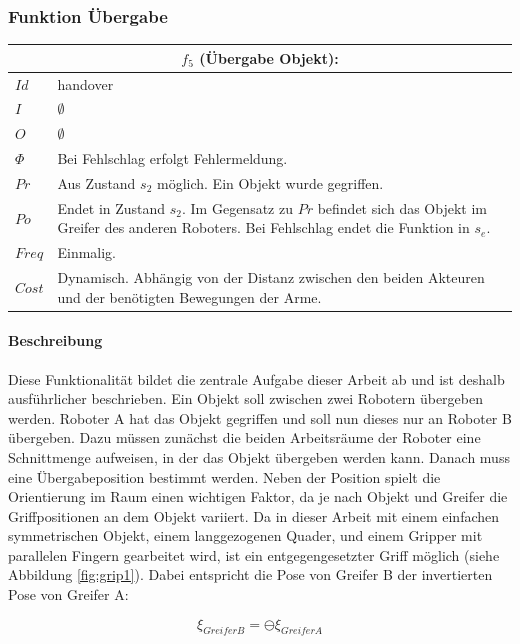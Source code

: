 \subsubsection{Funktion Übergabe}
\label{fun:han}
\begin{tabular}{|p{3cm}|p{10cm}|}
	\multicolumn{2}{c}{$f_5$ (Übergabe Objekt):}\\
	\hline  $Id$ & handover\\ 
	\hline  $I$ & $\emptyset$ \\ 
	\hline  $O$ & $\emptyset$ \\ 
	\hline  $\Phi$ & Bei Fehlschlag erfolgt Fehlermeldung.\\ 
	\hline $Pr$ & Aus Zustand $s_2$ möglich. Ein Objekt wurde gegriffen.  \\ 
	\hline $Po$ & Endet in Zustand $s_2$. Im Gegensatz zu $Pr$ befindet sich das Objekt im Greifer des anderen Roboters. Bei Fehlschlag endet die Funktion in $s_e$.\\ 
	\hline $Freq$ & Einmalig.\\ 
	\hline $Cost$ & Dynamisch. Abhängig von der Distanz zwischen den beiden Akteuren und der benötigten Bewegungen der Arme. \\
	\hline
\end{tabular} 

\paragraph{Beschreibung}
Diese Funktionalität bildet die zentrale Aufgabe dieser Arbeit ab und ist deshalb ausführlicher beschrieben. Ein Objekt soll zwischen zwei Robotern übergeben werden. Roboter A hat das Objekt gegriffen und soll nun dieses nur an Roboter B übergeben. Dazu müssen zunächst die beiden Arbeitsräume der Roboter eine Schnittmenge aufweisen, in der das Objekt übergeben werden kann. Danach muss eine Übergabeposition bestimmt werden. Neben der Position spielt die Orientierung im Raum einen wichtigen Faktor, da je nach Objekt und Greifer die Griffpositionen an dem Objekt variiert. Da in dieser Arbeit mit einem einfachen symmetrischen Objekt, einem langgezogenen Quader, und einem Gripper mit parallelen Fingern gearbeitet wird, ist ein entgegengesetzter Griff möglich (siehe Abbildung \ref{fig:grip1}). Dabei entspricht die Pose von Greifer B der invertierten Pose von Greifer A:

\begin{equation}
\xi_{GreiferB} = \ominus \xi_{GreiferA}
\label{eq:grip}
\end{equation}



